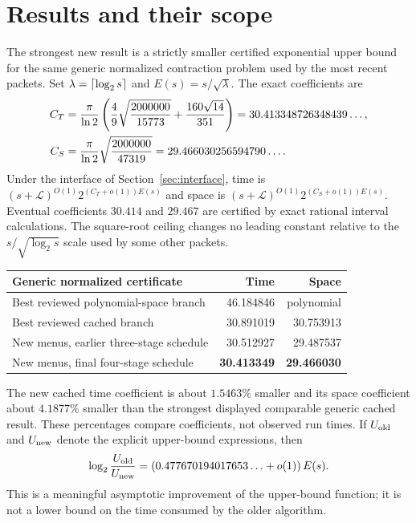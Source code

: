\section{Results and their scope}

The strongest new result is a strictly smaller certified exponential
upper bound for the same generic normalized contraction problem used by
the most recent packets. Set $\lambda=\left\lceil\log_2s\right\rceil$ and
$E(s)=s/\sqrt\lambda$. The exact coefficients are
\begin{align}
 C_T&=\frac\pi{\ln2}
 \left(\frac49\sqrt{\frac{2000000}{15773}}
             +\frac{160\sqrt{14}}{351}\right)=30.413348726348439\ldots,\label{eq:headline-time}\\
 C_S&=\frac\pi{\ln2}\sqrt{\frac{2000000}{47319}}=29.466030256594790\ldots.
 \label{eq:headline-space}
\end{align}
Under the interface of Section~\ref{sec:interface}, time is
$(s+\mathcal L)^{O(1)}2^{(C_T+o(1))E(s)}$ and space is
$(s+\mathcal L)^{O(1)}2^{(C_S+o(1))E(s)}$.
Eventual coefficients $30.414$ and $29.467$ are certified by exact rational
interval calculations. The square-root ceiling changes no leading constant
relative to the $s/\sqrt{\log_2s}$ scale used by some other packets.

\begin{center}
\begin{tabular}{p{7.5cm}rr}
\toprule
Generic normalized certificate & Time & Space\\\midrule
Best reviewed polynomial-space branch \cite{flags}&46.184846&polynomial\\
Best reviewed cached branch \cite{treecert}&30.891019&30.753913\\
New menus, earlier three-stage schedule&30.512927&29.487537\\
New menus, final four-stage schedule&\textbf{30.413349}&\textbf{29.466030}\\
\bottomrule
\end{tabular}
\end{center}

The new cached time coefficient is about $1.5463\%$ smaller and its space
coefficient about $4.1877\%$ smaller than the strongest displayed comparable
generic cached result. These percentages compare coefficients, not observed
run times. If $U_{\rm old}$ and $U_{\rm new}$ denote the explicit
upper-bound expressions, then
\[
 \log_2\frac{U_{\rm old}}{U_{\rm new}}
 =\left(0.477670194017653\ldots+o(1)\right)E(s).
\]
This is a meaningful asymptotic improvement of the upper-bound function;
it is not a lower bound on the time consumed by the older algorithm.

